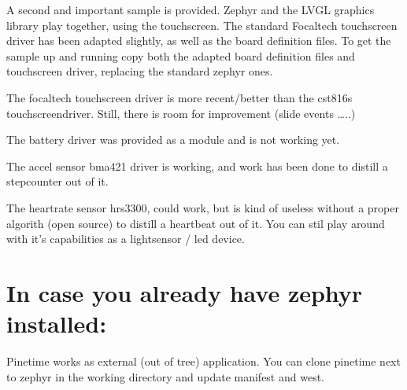 \documentclass[letterpaper,10pt,english]{sphinxmanual}
\begin{document}
\begin{sphinxVerbatim}[commandchars=\\\{\}]
     
\end{sphinxVerbatim}

A second and important sample is provided.
Zephyr and the LVGL graphics library play together, using the touchscreen.
The standard Focaltech touchscreen driver has been adapted slightly, as well as the board definition files.
To get the sample up and running copy both the adapted board definition files and touchscreen driver, replacing the standard zephyr ones.

\begin{sphinxVerbatim}[commandchars=\\\{\}]
     
\end{sphinxVerbatim}

The focaltech touchscreen driver is more recent/better than the cst816s touchscreendriver.
Still, there is room for improvement (slide events …..)

The battery driver was provided as a module and is not working yet.

The accel sensor bma421 driver is working, and work has been done to distill a stepcounter out of it.

The heartrate sensor hrs3300, could work, but is kind of useless without a proper algorith (open source) to distill a heartbeat out of it.
You can stil play around with it’s capabilities as a lightsensor / led device.


\section{In case you already have zephyr installed:}
\label{\detokenize{installation:in-case-you-already-have-zephyr-installed}}
Pinetime works as external (out of tree) application.
You can clone pinetime next to zephyr in the working directory and update manifest and west.

\begin{sphinxVerbatim}[commandchars=\\\{\}]
   
\end{sphinxVerbatim}
\end{document}
